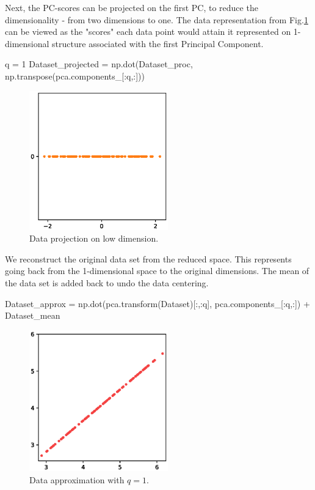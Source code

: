 \documentclass[10pt,twocolumn]{article}
\begin{document}
Next, the PC-scores can be projected on the first PC, to reduce the dimensionality - from two dimensions to one. The data representation from Fig.\ref{fig:python-data-projection} can be viewed as the "scores" each data point would attain it represented on 1-dimensional structure associated with the first Principal Component.

\begin{python}
q = 1
Dataset_projected = np.dot(Dataset_proc,
np.transpose(pca.components_[:q,:]))
\end{python}

\begin{figure}[H]
\centering\includegraphics[width=6cm]{python-data-projection.eps}
\caption{Data projection on low dimension.}
\label{fig:python-data-projection}
\end{figure}

We reconstruct the original data set from the reduced space. This represents going back from the 1-dimensional space to the original dimensions. The mean of the data set is added back to undo the data centering.

\begin{python}
Dataset_approx = 
np.dot(pca.transform(Dataset)[:,:q], 
pca.components_[:q,:]) + Dataset_mean
\end{python}

\begin{figure}[H]
\centering\includegraphics[width=6cm]{python-data-approximation.eps}
\caption{Data approximation with $q = 1$.}
\label{fig:python-data-approximation}
\end{figure}
\end{document}
